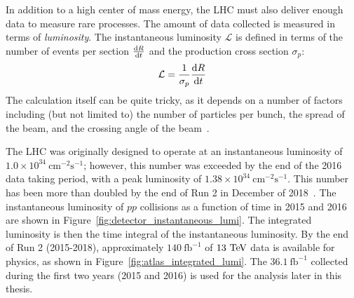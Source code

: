 In addition to a high center of mass energy, the LHC must also deliver enough data to measure rare processes.
The amount of data collected is measured in terms of \emph{luminosity}.
The instantaneous luminosity $\mathcal{L}$ is defined in terms of the number of events per section $\frac{\textrm{d}R}{\textrm{d}t}$ and the production cross section $\sigma_p$:
\begin{equation}
  \mathcal{L} = \frac{1}{\sigma_p}\deriv{R}{t}
  \label{eq:inst_lumi}
\end{equation}
The calculation itself can be quite tricky, as it depends on a number of factors including (but not limited to) the number of particles per bunch, the spread of the beam, and the crossing angle of the beam~\cite{2006.lumi}.

The LHC was originally designed to operate at an instantaneous luminosity of $1.0\times 10^{34}~\textrm{cm}^{-2}\textrm{s}^{-1}$; however, this number was exceeded by the end of the 2016 data taking period, with a peak luminosity of $1.38\times 10^{34}~\textrm{cm}^{-2}\textrm{s}^{-1}$.
This number has been more than doubled by the end of Run 2 in December of 2018~\cite{2019.atlas-lumi-plots}.
The instantaneous luminosity of $pp$ collisions as a function of time in 2015 and 2016 are shown in Figure~\ref{fig:detector_instantaneous_lumi}.
The integrated luminosity is then the time integral of the instantaneous luminosity.
By the end of Run 2 (2015-2018), approximately $140~\textrm{fb}^{-1}$ of $13\tev$ data is available for physics, as shown in Figure~\ref{fig:atlas_integrated_lumi}.
The $36.1~\textrm{fb}^{-1}$ collected during the first two years (2015 and 2016) is used for the analysis later in this thesis.

